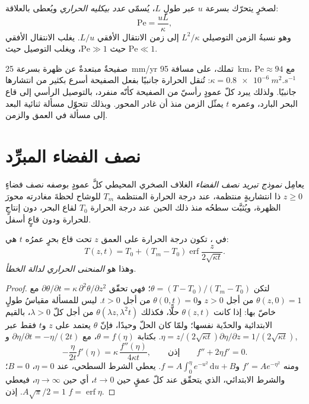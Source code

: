 \begin{definition}\label{def:b3:lithosphere-thermal-models:peclet}
لصخرٍ يتحرّك بسرعة $u$ عبر طولٍ $L$، يُسمّى \emph{عدد بيكليه
الحراري} ويُعطى بالعلاقة:
\[
  \mathrm{Pe} = \frac{uL}{\kappa},
\]
وهو نسبةُ الزمن التوصيلي $L^2/\kappa$ إلى زمن الانتقال الأفقي $L/u$.
يغلب الانتقال الأفقي حيث $\mathrm{Pe} \gg 1$، ويغلب التوصيل حيث
$\mathrm{Pe} \ll 1$.
\end{definition}

صفيحةٌ مبتعدةٌ عن ظهرة بسرعة \qty{25}{mm/yr} تملك، على مسافة
\qty{95}{km}، $\mathrm{Pe} \approx 94$ مع $\kappa = \qty{0.8e-6}{m^2.s^{-1}}$:
تُنقل الحرارة جانبيًا بفعل الصفيحة أسرع بكثير من انتشارها جانبيًا.
ولذلك يبرد كلّ عمودٍ رأسيّ من الصفيحة كأنّه منفرد، بالتوصيل الرأسي
إلى قاع البحر البارد، وعمره $t$ يمثّل الزمن منذ أن
غادر المحور. وبذلك تتحوّل مسألة ثنائية البعد إلى مسألة في العمق
والزمن.

\section{نصف الفضاء المبرِّد}

\begin{definition}\label{def:b3:lithosphere-thermal-models:half-space}
يعامِل \emph{نموذج تبريد نصف الفضاء} الغلاف الصخري المحيطي
كلَّ عمودٍ بوصفه نصف فضاءٍ $z \ge 0$ ذا انتشاريةٍ منتظمة،
عند درجة الحرارة المنتظمة $T_m$ للوشاح لحظةَ مغادرته
محورَ الظهرة، ويُثبَّت سطحُه منذ ذلك الحين عند درجة الحرارة $T_0$
لقاع البحر، دون إنتاجٍ للحرارة ودون قاعٍ أسفل.
\end{definition}

\begin{theorem}\label{thm:b3:lithosphere-thermal-models:erf}
في ، تكون درجة الحرارة على العمق $z$ تحت
قاع بحرٍ عمرُه $t$ هي:
\[
  T(z, t) = T_0 + (T_m - T_0)\operatorname{erf}\frac{z}{2\sqrt{\kappa t}} .
\]
وهذا هو \emph{المنحنى الحراري لدالة الخطأ}.
\end{theorem}

\begin{proof}
لتكن $\theta = (T - T_0)/(T_m - T_0)$؛ فهي تحقّق $\partial\theta/\partial t =
\kappa\,\partial^2\theta/\partial z^2$ مع $\theta(z, 0) = 1$ من أجل $z > 0$
و$\theta(0, t) = 0$ من أجل $t > 0$. ليس للمسألة مقياسُ طولٍ خاصّ بها:
إذا كانت $\theta(z, t)$ حلًّا، فكذلك $\theta(\lambda z, \lambda^2t)$ من أجل كلّ
$\lambda > 0$، بالقيم الابتدائية والحدّية نفسها؛ ولمّا كان الحلّ
وحيدًا، فإنّ $\theta$ يعتمد على $z$ و$t$ فقط عبر $\eta = z/(2\sqrt{\kappa
t})$. بكتابة $\theta = f(\eta)$، مع $\partial\eta/\partial t = -\eta/(2t)$
و$\partial\eta/\partial z = 1/(2\sqrt{\kappa t})$,
\[
  -\frac{\eta}{2t}f'(\eta) = \kappa\,\frac{f''(\eta)}{4\kappa t},
  \qquad\text{إذن}\qquad f'' + 2\eta f' = 0 .
\]
ومنه $f' = Ae^{-\eta^2}$ و$f = A\int_0^\eta e^{-u^2}\,\mathrm du + B$.
يعطي الشرط السطحي، عند $\eta = 0$، $B = 0$؛ والشرط الابتدائي، الذي
يتحقّق عند كلّ عمقٍ حين $t \to 0$، أي حين $\eta \to \infty$، فيعطي
$A\sqrt\pi/2 = 1$. إذن $f = \operatorname{erf}\eta$.
\end{proof}


